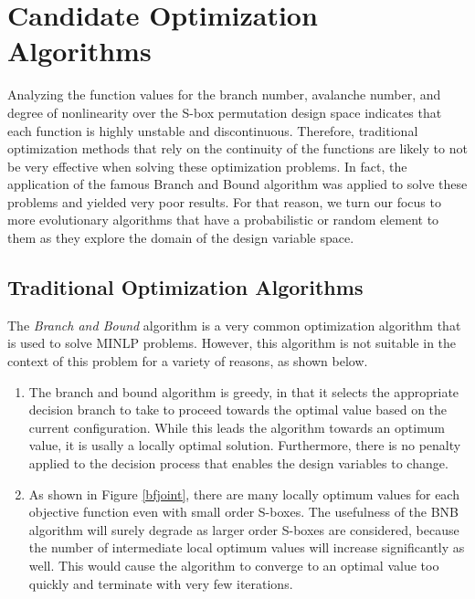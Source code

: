 \documentclass[11pt]{article}
\begin{document}
\section{Candidate Optimization Algorithms}

Analyzing the function values for the branch number, avalanche number, and degree of nonlinearity over the S-box permutation design space indicates that each function is highly unstable and discontinuous. Therefore, traditional optimization methods that rely on the continuity of the functions are likely to not be very effective when solving these optimization problems. In fact, the application of the famous Branch and Bound algorithm was applied to solve these problems and yielded very poor results. For that reason, we turn our focus to more evolutionary algorithms that have a probabilistic or random element to them as they explore the domain of the design variable space. 

\subsection{Traditional Optimization Algorithms}

The \emph{Branch and Bound} algorithm is a very common optimization algorithm that is used to solve MINLP problems. However, this algorithm is not suitable in the context of this problem for a variety of reasons, as shown below.

\begin{enumerate}
	\item The branch and bound algorithm is greedy, in that it selects the appropriate decision branch to take to proceed towards the optimal value based on the current configuration. While this leads the algorithm towards an optimum value, it is usally a locally optimal solution. Furthermore, there is no penalty applied to the decision process that enables the design variables to change. 
	\item As shown in Figure \ref{bfjoint}, there are many locally optimum values for each objective function even with small order S-boxes. The usefulness of the BNB algorithm will surely degrade as larger order S-boxes are considered, because the number of intermediate local optimum values will increase significantly as well. This would cause the algorithm to converge to an optimal value too quickly and terminate with very few iterations. 
\end{enumerate}
\end{document}
